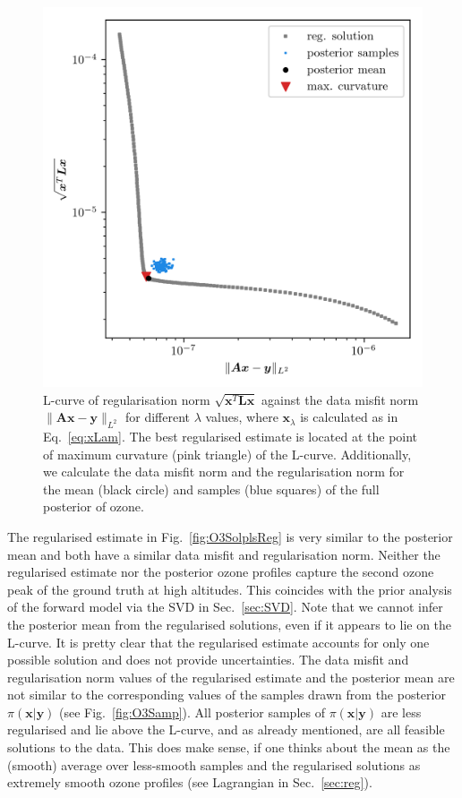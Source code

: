\begin{figure}[ht!]
	\centering
	\includegraphics{LCurvePhD.png}
	\caption[Plot of the L-curve to find the regularised solution.]{L-curve of regularisation norm $\sqrt{\bm{x}^T\bm{Lx}}$ against the data misfit norm $\lVert \bm{A}\bm{x} - \bm{y} \rVert_{L^2}$ for different $\lambda$ values, where $\bm{x}_{\lambda}$ is calculated as in Eq.~\ref{eq:xLam}. The best regularised estimate is located at the point of maximum curvature (pink triangle) of the L-curve. Additionally, we calculate the data misfit norm and the regularisation norm for the mean (black circle) and samples (blue squares) of the full posterior of ozone.}
	\label{fig:LCurve}
\end{figure}
The regularised estimate in Fig.~\ref{fig:O3SolplsReg} is very similar to the posterior mean and both have a similar data misfit and regularisation norm.
Neither the regularised estimate nor the posterior ozone profiles capture the second ozone peak of the ground truth at high altitudes.
This coincides with the prior analysis of the forward model via the SVD in Sec.~\ref{sec:SVD}.
Note that we cannot infer the posterior mean from the regularised solutions, even if it appears to lie on the L-curve.
It is pretty clear that the regularised estimate accounts for only one possible solution and does not provide uncertainties. 
The data misfit and regularisation norm values of the regularised estimate and the posterior mean are not similar to the corresponding values of the samples drawn from the posterior $\pi(\bm{x}| \bm{y})$ (see Fig.~\ref{fig:O3Samp}).
All posterior samples of $\pi(\bm{x}| \bm{y})$ are less regularised and lie above the L-curve, and as already mentioned, are all feasible solutions to the data.
This does make sense, if one thinks about the mean as the (smooth) average over less-smooth samples and the regularised solutions as extremely smooth ozone profiles (see Lagrangian in Sec.~\ref{sec:reg}).

